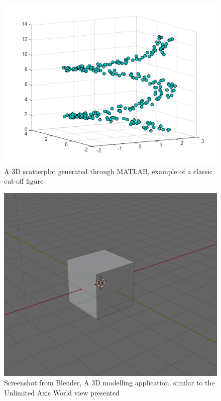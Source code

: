\begin{figure}[h]
    \centering
    \includegraphics[width=0.7\columnwidth]{author-files/figures/SetMarkerPropertiesExample_01_MATLAB.png}
    \caption{A 3D scatterplot generated through MATLAB, example of a classic cut-off figure}
    \label{fig:MatlabPlot}
\end{figure}

\begin{figure}[h]
    \centering
    \includegraphics[width=0.7\columnwidth]{author-files/figures/worldnavblender.png}
    \caption{Screenshot from Blender, A 3D modelling application, similar to the Unlimited Axis World view presented}
    \label{fig:MatlabPlot}
\end{figure}

